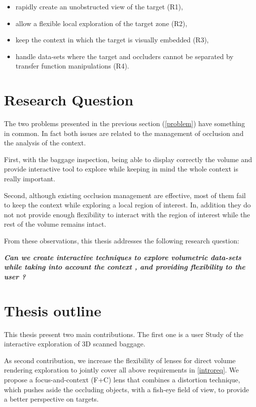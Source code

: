 \begin{itemize}

\item rapidly create an unobstructed view of the target (R1),

\item allow a flexible local exploration of the target zone (R2),

\item keep the context in which the target is visually embedded (R3),

\item handle data-sets where the target and occluders cannot 
be separated by transfer function manipulations (R4).

\end{itemize}

\section{Research Question}

The two problems presented in the previous section (\autoref{problem}) have something in common. In fact both issues are related to the management of occlusion and the analysis of the context. 

First, with the baggage inspection, being able to display correctly the volume and provide interactive tool to explore while keeping in mind the whole context is really important.

Second, although existing occlusion management are effective, most of them fail to keep the context while exploring a local region of interest. In, addition they do not not provide enough flexibility to interact with the region of interest while the rest of the volume remains intact.

From these observations, this thesis addresses the following research question: 

\textbf{\textit{
Can we create interactive techniques to explore volumetric data-sets  while taking into account the context , and providing flexibility to the user ? }}


\section{ Thesis outline }

This thesis present two main contributions. The first one is  a  user Study of the interactive exploration of 3D scanned baggage.

 As second contribution, we increase the flexibility of lenses for direct volume rendering exploration to jointly cover all above requirements in \autoref{introreq}. We propose a focus-and-context (F+C) lens that combines a distortion technique, which pushes aside the occluding objects, with a fish-eye field of view, to provide a better perspective on targets.
 

